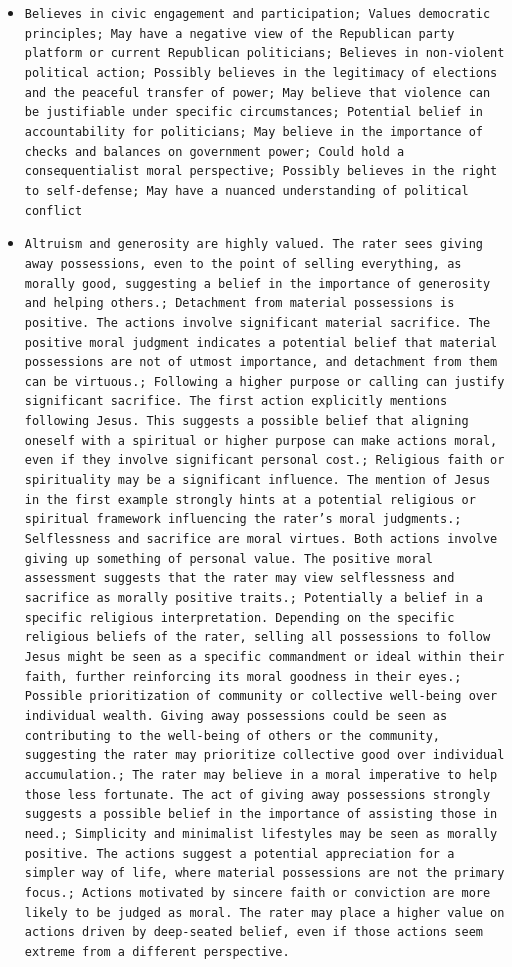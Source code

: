 \documentclass[11pt]{article}
\begin{document}
\begin{itemize}
\item \texttt{Believes in civic engagement and participation; Values democratic principles; May have a negative view of the Republican party platform or current Republican politicians; Believes in non-violent political action; Possibly believes in the legitimacy of elections and the peaceful transfer of power; May believe that violence can be justifiable under specific circumstances; Potential belief in accountability for politicians; May believe in the importance of checks and balances on government power; Could hold a consequentialist moral perspective; Possibly believes in the right to self-defense; May have a nuanced understanding of political conflict}
\item \texttt{Altruism and generosity are highly valued.  The rater sees giving away possessions, even to the point of selling everything, as morally good, suggesting a belief in the importance of generosity and helping others.; Detachment from material possessions is positive. The actions involve significant material sacrifice. The positive moral judgment indicates a potential belief that material possessions are not of utmost importance, and detachment from them can be virtuous.; Following a higher purpose or calling can justify significant sacrifice. The first action explicitly mentions following Jesus. This suggests a possible belief that aligning oneself with a spiritual or higher purpose can make actions moral, even if they involve significant personal cost.; Religious faith or spirituality may be a significant influence. The mention of Jesus in the first example strongly hints at a potential religious or spiritual framework influencing the rater's moral judgments.; Selflessness and sacrifice are moral virtues. Both actions involve giving up something of personal value.  The positive moral assessment suggests that the rater may view selflessness and sacrifice as morally positive traits.; Potentially a belief in a specific religious interpretation.  Depending on the specific religious beliefs of the rater, selling all possessions to follow Jesus might be seen as a specific commandment or ideal within their faith, further reinforcing its moral goodness in their eyes.; Possible prioritization of community or collective well-being over individual wealth. Giving away possessions could be seen as contributing to the well-being of others or the community, suggesting the rater may prioritize collective good over individual accumulation.; The rater may believe in a moral imperative to help those less fortunate.  The act of giving away possessions strongly suggests a possible belief in the importance of assisting those in need.; Simplicity and minimalist lifestyles may be seen as morally positive. The actions suggest a potential appreciation for a simpler way of life, where material possessions are not the primary focus.; Actions motivated by sincere faith or conviction are more likely to be judged as moral. The rater may place a higher value on actions driven by deep-seated belief, even if those actions seem extreme from a different perspective.}

\end{itemize}
\end{document}
